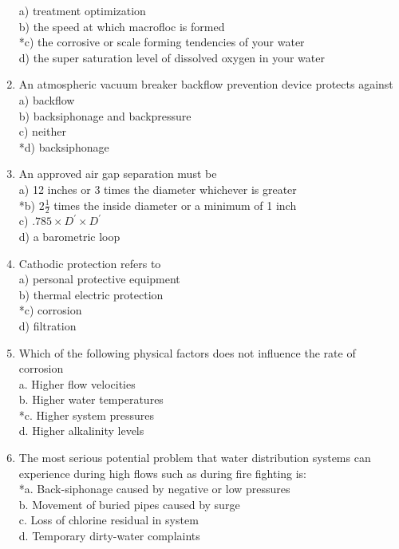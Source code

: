 \begin{enumerate}[1.]
a) treatment optimization\\
b) the speed at which macrofloc is formed\\
*c) the corrosive or scale forming tendencies of your water\\
d) the super saturation level of dissolved oxygen in your water\\
\item An atmospheric vacuum breaker backflow prevention device protects against\\
a) backflow\\
b) backsiphonage and backpressure\\
c) neither\\
*d) backsiphonage\\
\item An approved air gap separation must be\\
a) 12 inches or 3 times the diameter whichever is greater\\
*b) $2 \frac{1}{2}$ times the inside diameter or a minimum of 1 inch\\
c) $.785 \times D^{\prime} \times D^{\prime}$\\
d) a barometric loop\\
\item Cathodic protection refers to\\
a) personal protective equipment\\
b) thermal electric protection\\
*c) corrosion\\
d) filtration\\
\item Which of the following physical factors does not influence the rate of corrosion\\
a.  Higher flow velocities\\
b.  Higher water temperatures\\
*c.  Higher system pressures\\
d.  Higher alkalinity levels\\
\item The most serious potential problem that water distribution systems can experience during high flows such as during fire fighting is:\\
*a.  Back-siphonage caused by negative or low pressures\\
b.  Movement of buried pipes caused by surge\\
c.  Loss of chlorine residual in system\\
d.  Temporary dirty-water complaints\\

\end{enumerate}
